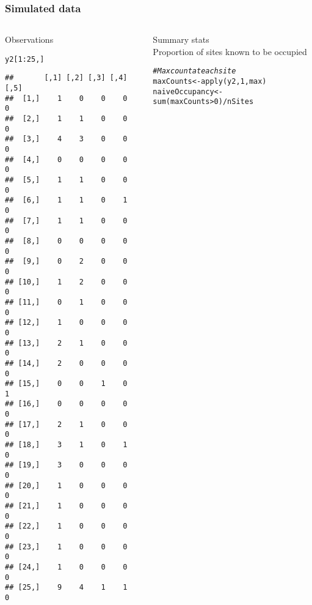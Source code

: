 \documentclass[color=usenames,dvipsnames]{beamer}\usepackage[]{graphicx}\usepackage[]{color}
\makeatletter
\newcommand{\hlnum}[1]{\textcolor[rgb]{0.69,0.494,0}{#1}}%
\newcommand{\hlcom}[1]{\textcolor[rgb]{0.514,0.506,0.514}{\textit{#1}}}%
\newcommand{\hlopt}[1]{\textcolor[rgb]{0,0,0}{#1}}%
\newcommand{\hlstd}[1]{\textcolor[rgb]{0,0,0}{#1}}%
\newcommand{\hlkwb}[1]{\textcolor[rgb]{0,0.341,0.682}{#1}}%
\newcommand{\hlkwd}[1]{\textcolor[rgb]{0.004,0.004,0.506}{#1}}%
\newenvironment{kframe}{%
 \def\at@end@of@kframe{}%
 \ifinner\ifhmode%
  \def\at@end@of@kframe{\end{minipage}}%
  \begin{minipage}{\columnwidth}%
 \fi\fi%
 \def\FrameCommand##1{\hskip\@totalleftmargin \hskip-\fboxsep
 \colorbox{shadecolor}{##1}\hskip-\fboxsep
     \hskip-\linewidth \hskip-\@totalleftmargin \hskip\columnwidth}%
 \MakeFramed {\advance\hsize-\width
   \@totalleftmargin\z@ \linewidth\hsize
   \@setminipage}}%
 {\par\unskip\endMakeFramed%
 \at@end@of@kframe}
\newenvironment{knitrout}{}{} %
\makeatother
\begin{document}
\begin{frame}[fragile]
  \frametitle{Simulated data}
  \begin{columns}
    \begin{column}{0.4\textwidth}
      \small
      Observations
  \vspace{-6pt}
\begin{knitrout}\tiny
{}\color{fgcolor}\begin{kframe}
\begin{alltt}
\hlstd{y2[}\hlnum{1}\hlopt{:}\hlnum{25}\hlstd{,]}
\end{alltt}
\begin{verbatim}
##       [,1] [,2] [,3] [,4] [,5]
##  [1,]    1    0    0    0    0
##  [2,]    1    1    0    0    0
##  [3,]    4    3    0    0    0
##  [4,]    0    0    0    0    0
##  [5,]    1    1    0    0    0
##  [6,]    1    1    0    1    0
##  [7,]    1    1    0    0    0
##  [8,]    0    0    0    0    0
##  [9,]    0    2    0    0    0
## [10,]    1    2    0    0    0
## [11,]    0    1    0    0    0
## [12,]    1    0    0    0    0
## [13,]    2    1    0    0    0
## [14,]    2    0    0    0    0
## [15,]    0    0    1    0    1
## [16,]    0    0    0    0    0
## [17,]    2    1    0    0    0
## [18,]    3    1    0    1    0
## [19,]    3    0    0    0    0
## [20,]    1    0    0    0    0
## [21,]    1    0    0    0    0
## [22,]    1    0    0    0    0
## [23,]    1    0    0    0    0
## [24,]    1    0    0    0    0
## [25,]    9    4    1    1    0
\end{verbatim}
\end{kframe}
\end{knitrout}
  \end{column}
  \begin{column}{0.6\textwidth}
    \pause
    {\centering Summary stats \\}
    \vspace{24pt}
    \small
    Proportion of sites known to be occupied
    \vspace{-6pt}
\begin{knitrout}\scriptsize
{}\color{fgcolor}\begin{kframe}
\begin{alltt}
\hlcom{# Max count at each site}
\hlstd{maxCounts} \hlkwb{<-} \hlkwd{apply}\hlstd{(y2,} \hlnum{1}\hlstd{, max)}
\hlstd{naiveOccupancy} \hlkwb{<-} \hlkwd{sum}\hlstd{(maxCounts}\hlopt{>}\hlnum{0}\hlstd{)}\hlopt{/}\hlstd{nSites}

\end{alltt}
\end{kframe}
\end{knitrout}
\end{column}
\end{columns}
\end{frame}
\end{document}
